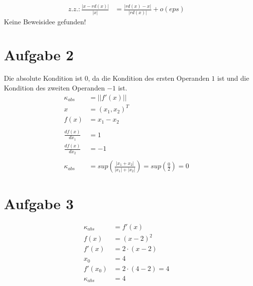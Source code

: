 \documentclass{llncs}
\begin{document}
\begin{align*}
z.z.: \frac{|x-rd(x)|}{|x|} &= \frac{|rd(x) - x|}{|rd(x)|} + o(eps)
\end{align*}
Keine Beweisidee gefunden!

\section*{Aufgabe 2}

Die absolute Kondition ist $0$, da die Kondition des ersten Operanden $1$ ist und die Kondition des zweiten Operanden $-1$ ist.
\begin{align*}
\kappa_{abs} &= || f'(x) || \\
x &= (x_1,x_2)^T \\
f(x) &= x_1-x_2 \\
\\
\frac{d f(x)}{dx_1} &= 1 \\
\frac{d f(x)}{dx_2} &= -1 \\
\\
\kappa_{abs} &= sup \left( \frac{|x_1 + x_2|}{|x_1| + |x_2|} \right) = sup \left( \frac{0}{2} \right) = 0
\end{align*}

\section*{Aufgabe 3}

\begin{align*}
\kappa_{abs} &= f'(x) \\
f(x) &= (x-2)^2 \\
f'(x) &= 2 \cdot (x-2) \\
x_0 &= 4 \\
f'(x_0) &= 2 \cdot (4-2) = 4 \\
\kappa_{abs} &= 4
\end{align*}
\end{document}

